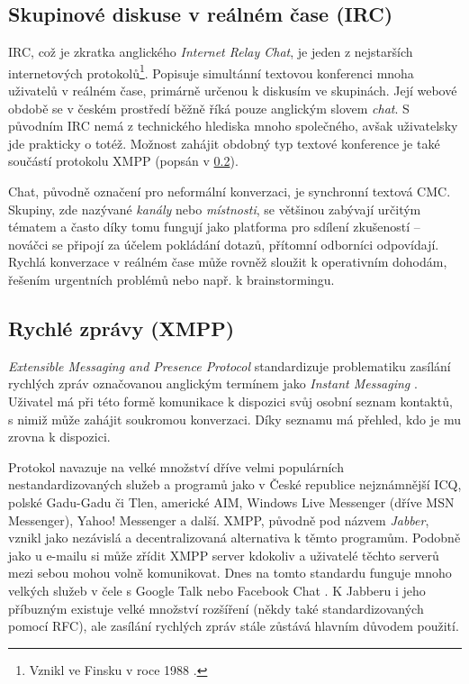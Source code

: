 \documentclass[12pt,oneside,final]{fithesis2}
\begin{document}
\subsection{Skupinové diskuse v reálném čase (IRC)}\label{irc}
IRC, což je zkratka anglického {\it Internet Relay Chat}, je jeden z nejstarších internetových protokolů\footnote{Vznikl ve Finsku v roce 1988 \cite{oikarinen2011founding}.}. Popisuje simultánní textovou konferenci mnoha uživatelů v reálném čase, primárně určenou k diskusím ve skupinách. Její webové obdobě se v českém prostředí běžně říká pouze anglickým slovem {\it chat}. S původním IRC nemá z technického hlediska mnoho společného, avšak uživatelsky jde prakticky o totéž. Možnost zahájit obdobný typ textové konference je také součástí protokolu XMPP (popsán v \ref{xmpp}).

Chat, původně označení pro neformální konverzaci, je synchronní textová CMC. Skupiny, zde nazývané {\it kanály} nebo {\it místnosti}, se většinou zabývají určitým tématem a často díky tomu fungují jako platforma pro sdílení zkušeností -- nováčci se připojí za účelem pokládání dotazů, přítomní odborníci odpovídají. Rychlá konverzace v reálném čase může rovněž sloužit k operativním dohodám, řešením urgentních problémů nebo např. k brainstormingu.

\subsection{Rychlé zprávy (XMPP)}\label{xmpp}
{\it Extensible Messaging and Presence Protocol} standardizuje problematiku zasílání rychlých zpráv označovanou anglickým termínem jako {\it Instant Messaging} \cite{saintandre2004xmppcore} \cite{saintandre2004xmppim}. Uživatel má při této formě komunikace k dispozici svůj osobní seznam kontaktů, s nimiž může zahájit soukromou konverzaci. Díky seznamu má přehled, kdo je mu zrovna k dispozici.

Protokol navazuje na velké množství dříve velmi populárních nestandardizovaných služeb a programů jako v České republice nejznámnější ICQ, polské Gadu-Gadu či Tlen, americké AIM, Windows Live Messenger (dříve MSN Messenger), Yahoo! Messenger a další. XMPP, původně pod názvem {\it Jabber}, vznikl jako nezávislá a decentralizovaná alternativa k těmto programům. Podobně jako u e-mailu si může zřídit XMPP server kdokoliv a uživatelé těchto serverů mezi sebou mohou volně komunikovat. Dnes na tomto standardu funguje mnoho velkých služeb v čele s Google Talk \cite{bau2005google} nebo Facebook Chat \cite{reiss2010facebook}. K Jabberu i jeho příbuzným existuje velké množství rozšíření (někdy také standardizovaných pomocí RFC), ale zasílání rychlých zpráv stále zůstává hlavním důvodem použití.
\end{document}
